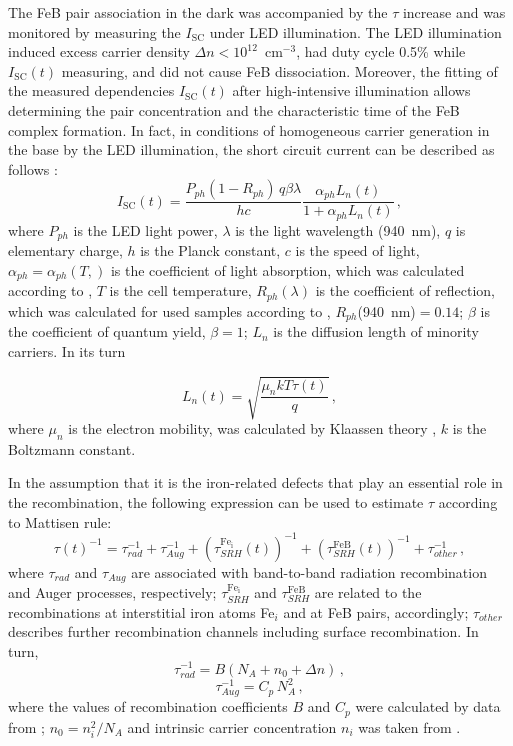 \documentclass[sn-mathphys]{sn-jnl}%
\theoremstyle{thmstyleone}%
\theoremstyle{thmstyletwo}%
\theoremstyle{thmstylethree}%
\begin{document}
The FeB pair association in the dark was accompanied by the $\tau$ increase and
was monitored by measuring the $I_\mathrm{SC}$ under LED illumination.
The LED illumination induced excess carrier density $\Delta n<10^{12}$~cm$^{-3}$,
had duty cycle 0.5\% while $I_\mathrm{SC}(t)$ measuring,
and did not cause FeB dissociation.
Moreover, the fitting of the measured dependencies $I_\mathrm{SC}(t)$ after high-intensive illumination
allows determining  the pair concentration and the characteristic time of the FeB complex formation.
In fact, in conditions of homogeneous carrier generation in the base  by the LED illumination,
the short circuit current can be described as follows \cite{Bube,Razeghi}:
\begin{equation}
\label{eqIsc}
I_\mathrm{SC}(t)=\frac{P_{ph}(1-R_{ph})\,q\beta\lambda}{hc}\frac{\alpha_{ph}L_n(t)}{1+\alpha_{ph}L_n(t)}\,,
\end{equation}
where
$P_{ph}$ is the LED light power,
$\lambda$ is the light wavelength (940~nm),
$q$ is elementary charge,
$h$ is the Planck constant,
$c$ is the speed of light,
$\alpha_{ph}=\alpha_{ph}(T,)$ is the coefficient of light absorption,
which was calculated according to \cite{Si:Absorb,GreenOptic},
$T$ is the cell temperature,
$R_{ph}(\lambda)$ is the coefficient of reflection,
which was calculated for used samples according to \cite{KostRefl2000,KostRefl2000A}, $R_{ph}$(940~nm)$=0.14$;
$\beta$ is the coefficient of quantum  yield, $\beta=1$;
$L_n$  is the diffusion length of minority carriers.
In its turn


\begin{equation}
\label{eqLn}
L_n(t)=\sqrt{\frac{\mu_nkT\tau(t)}{q}}\,,
\end{equation}
where
$\mu_n$ is the electron mobility, was calculated by Klaassen theory \cite{KLAASSEN953},
$k$ is the Boltzmann constant.

In the assumption that it is the iron-related defects that play an essential role in the recombination,
the following expression can be used to estimate $\tau$ according to Mattisen rule:
\begin{equation}
\label{eqTau}
\tau(t)^{-1}=\tau_{rad}^{-1}+\tau_{Aug}^{-1}+(\tau_{SRH}^{\mathrm{Fe_i}}(t))^{-1}
+(\tau_{SRH}^\mathrm{FeB}(t))^{-1}+\tau_{other}^{-1}\,,
\end{equation}
where
$\tau_{rad}$ and $\tau_{Aug}$ are associated with
band-to-band radiation recombination and Auger processes, respectively;
$\tau_{SRH}^{\mathrm{Fe_i}}$  and $\tau_{SRH}^\mathrm{FeB}$ are related to the
recombinations at interstitial iron atoms Fe$_i$ and at FeB pairs, accordingly;
$\tau_{other}$ describes further
recombination channels including surface recombination.
In turn,
\begin{equation}
\label{eqTauRad}
\tau_{rad}^{-1}=B(N_A+n_0+\Delta n)\,,
\end{equation}
\begin{equation}
\label{eqTauAug}
\tau_{Aug}^{-1}=C_p\,N_A^2\,,
\end{equation}
where the values of recombination coefficients $B$ and $C_p$ were calculated by data from \cite{Si_BtB,Si_Auger};
$n_0=n_i^2/N_A$ and intrinsic carrier concentration $n_i$ was taken from \cite{Si_ni_Couderc}.
\end{document}

